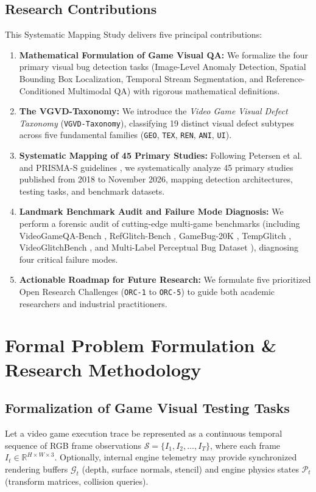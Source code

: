 \documentclass[preprint,12pt,3p]{elsarticle}
\begin{document}
\subsection{Research Contributions}
This Systematic Mapping Study delivers five principal contributions:
\begin{enumerate}
    \item \textbf{Mathematical Formulation of Game Visual QA:} We formalize the four primary visual bug detection tasks (Image-Level Anomaly Detection, Spatial Bounding Box Localization, Temporal Stream Segmentation, and Reference-Conditioned Multimodal QA) with rigorous mathematical definitions.
    \item \textbf{The VGVD-Taxonomy:} We introduce the \textit{Video Game Visual Defect Taxonomy} (\texttt{VGVD-Taxonomy}), classifying 19 distinct visual defect subtypes across five fundamental families (\texttt{GEO}, \texttt{TEX}, \texttt{REN}, \texttt{ANI}, \texttt{UI}).
    \item \textbf{Systematic Mapping of 45 Primary Studies:} Following Petersen et al. \cite{petersen2015guidelines} and PRISMA-S guidelines \cite{page2021prisma}, we systematically analyze 45 primary studies published from 2018 to November 2026, mapping detection architectures, testing tasks, and benchmark datasets.
    \item \textbf{Landmark Benchmark Audit and Failure Mode Diagnosis:} We perform a forensic audit of cutting-edge multi-game benchmarks (including VideoGameQA-Bench \cite{taesiri2025videogameqa}, RefGlitch-Bench \cite{yu2026refglitch}, GameBug-20K \cite{lu2026howfarvlms}, TempGlitch \cite{muller2026tempglitch}, VideoGlitchBench \cite{zheng2026glide}, and Multi-Label Perceptual Bug Dataset \cite{rifaat2026multilabel}), diagnosing four critical failure modes.
    \item \textbf{Actionable Roadmap for Future Research:} We formulate five prioritized Open Research Challenges (\texttt{ORC-1} to \texttt{ORC-5}) to guide both academic researchers and industrial practitioners.
\end{enumerate}

\section{Formal Problem Formulation \& Research Methodology}

\subsection{Formalization of Game Visual Testing Tasks}
Let a video game execution trace be represented as a continuous temporal sequence of RGB frame observations $\mathcal{S} = \{I_1, I_2, \dots, I_T\}$, where each frame $I_t \in \mathbb{R}^{H \times W \times 3}$. Optionally, internal engine telemetry may provide synchronized rendering buffers $\mathcal{G}_t$ (depth, surface normals, stencil) and engine physics states $\mathcal{P}_t$ (transform matrices, collision queries).
\end{document}
